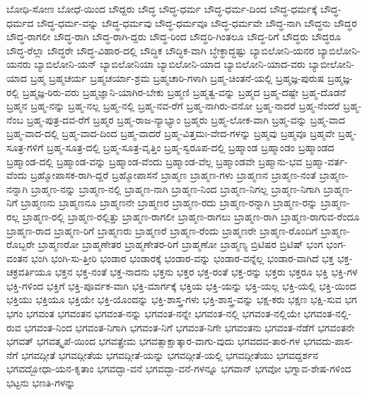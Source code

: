 {ಬೋಧಿ-ಸೋಣ
ಬೋಧೆ-ಯಿಂದ
ಬೌದ್ದರು
ಬೌದ್ಧ
ಬೌದ್ಧ-ಧರ್ಮ
ಬೌದ್ಧ-ಧರ್ಮ-ದಿಂದ
ಬೌದ್ಧ-ಧರ್ಮಕ್ಕೆ
ಬೌದ್ಧ-ಧರ್ಮದ
ಬೌದ್ಧ-ಧರ್ಮ-ವನ್ನು
ಬೌದ್ಧ-ಧರ್ಮವು
ಬೌದ್ಧ-ಧರ್ಮವೂ
ಬೌದ್ಧ-ಧರ್ಮವೇ
ಬೌದ್ಧ-ನಾಗಿ
ಬೌದ್ಧನು
ಬೌದ್ಧರ
ಬೌದ್ಧ-ರಾಗಲೀ
ಬೌದ್ಧ-ರಾಗಿ
ಬೌದ್ಧ-ರಾಗಿ-ದ್ದರು
ಬೌದ್ಧ-ರಿಂದ
ಬೌದ್ಧರಿ-ಗಿಂತಲೂ
ಬೌದ್ಧ-ರಿಗೆ
ಬೌದ್ಧರು
ಬೌದ್ಧರೂ
ಬೌದ್ಧ-ರೆಲ್ಲಾ
ಬೌದ್ಧರೇ
ಬೌದ್ಧ-ವಿಹಾರ-ದಲ್ಲಿ
ಬೌದ್ಧಿಕ
ಬೌದ್ಧಿಕ-ವಾಗಿ
ಬ್ಧೇಕ್ಧಾದ್ಧಷ್ಟು
ಬ್ಯಾಬಿಲೋನಿ-ಯನರ
ಬ್ಯಾಬಿಲೋನಿ-ಯನರು
ಬ್ಯಾಬಿಲೋನಿ-ಯನ್
ಬ್ಯಾಬಿಲೋನಿಯಾ
ಬ್ಯಾಬಿಲೋನಿ-ಯಾದ
ಬ್ಯಾಬಿಲೋನಿ-ಯಾದ-ವರು
ಬ್ಯಾಬೀಲೋನಿ-ಯಾದ
ಬ್ರಹ್ಮ
ಬ್ರಹ್ಮಚರ್ಯ
ಬ್ರಹ್ಮಚರ್ಯಾ-ಶ್ರಮ
ಬ್ರಹ್ಮಚಾರಿ-ಗಳಾಗಿ
ಬ್ರಹ್ಮ-ಚಿಂತನೆ-ಯಲ್ಲಿ
ಬ್ರಹ್ಮಜ್ಞ-ಪುರುಷ
ಬ್ರಹ್ಮಜ್ಞ-ರಲ್ಲಿ
ಬ್ರಹ್ಮಜ್ಞ-ರಿರು-ವರು
ಬ್ರಹ್ಮಜ್ಞಾನಿ-ಯಾಗಿರ-ಬೇಕು
ಬ್ರಹ್ಮಣಿ
ಬ್ರಹ್ಮತ್ವ-ವನ್ನು
ಬ್ರಹ್ಮದ
ಬ್ರಹ್ಮ-ದಷ್ಟೇ
ಬ್ರಹ್ಮ-ದೊಡನೆ
ಬ್ರಹ್ಮನ
ಬ್ರಹ್ಮ-ನನ್ನು
ಬ್ರಹ್ಮ-ನಲ್ಲ
ಬ್ರಹ್ಮ-ನಲ್ಲಿ
ಬ್ರಹ್ಮ-ನವ-ರೆಗೆ
ಬ್ರಹ್ಮ-ನಾಗಿರು-ವನೋ
ಬ್ರಹ್ಮ-ನಾದರೆ
ಬ್ರಹ್ಮ-ನೆಂದರೆ
ಬ್ರಹ್ಮ-ನೆಂಬ
ಬ್ರಹ್ಮ-ಪುತ್ರ-ದವ-ರೆಗೆ
ಬ್ರಹ್ಮರ
ಬ್ರಹ್ಮ-ರಾಜ-ನ್ಯಾಭ್ಯಾಂ
ಬ್ರಹ್ಮರು
ಬ್ರಹ್ಮ-ಲೋಕ-ವಾಗಿ
ಬ್ರಹ್ಮ-ವನ್ನು
ಬ್ರಹ್ಮ-ವಾದ
ಬ್ರಹ್ಮ-ವಾದ-ದಲ್ಲಿ
ಬ್ರಹ್ಮ-ವಾದ-ದಿಂದ
ಬ್ರಹ್ಮ-ವಾದರೆ
ಬ್ರಹ್ಮ-ವಿತ್ತಮಃ-ವೇದ-ಗಳನ್ನು
ಬ್ರಹ್ಮವು
ಬ್ರಹ್ಮವೂ
ಬ್ರಹ್ಮವೇ
ಬ್ರಹ್ಮ-ಸೂತ್ರ-ಗಳಿಗೆ
ಬ್ರಹ್ಮ-ಸೂತ್ರ-ದಲ್ಲಿ
ಬ್ರಹ್ಮ-ಸೂತ್ರ-ವೃತ್ತಿಂ
ಬ್ರಹ್ಮ-ಸ್ವರೂಪ-ದಲ್ಲಿ
ಬ್ರಹ್ಮಾಂಡ
ಬ್ರಹ್ಮಾಂಡಂ
ಬ್ರಹ್ಮಾಂಡದ
ಬ್ರಹ್ಮಾಂಡ-ದಲ್ಲಿ
ಬ್ರಹ್ಮಾಂಡ-ವನ್ನು
ಬ್ರಹ್ಮಾಂಡ-ವೆಂದು
ಬ್ರಹ್ಮಾಂಡ-ವೆಲ್ಲ
ಬ್ರಹ್ಮಾಂಡವೇ
ಬ್ರಹ್ಮಾನು-ಭವ
ಬ್ರಹ್ಮಾ-ವರ್ತ-ವೆಂದು
ಬ್ರಹ್ಮೋಪಾಸಕ-ರಾಗಿ-ದ್ದರೆ
ಬ್ರಹ್ಮೋಪಾಸನೆ
ಬ್ರಾಹ್ಮಣ
ಬ್ರಾಹ್ಮಣ-ಗಳು
ಬ್ರಾಹ್ಮಣನ
ಬ್ರಾಹ್ಮಣ-ನಂತೆ
ಬ್ರಾಹ್ಮಣ-ನನ್ನಾಗಿ
ಬ್ರಾಹ್ಮಣ-ನನ್ನು
ಬ್ರಾಹ್ಮಣ-ನಲ್ಲಿ
ಬ್ರಾಹ್ಮಣ-ನಾಗಿ
ಬ್ರಾಹ್ಮಣ-ನಿಂದ
ಬ್ರಾಹ್ಮಣ-ನಿಗಲ್ಲ
ಬ್ರಾಹ್ಮಣ-ನಿಗಾಗಿ
ಬ್ರಾಹ್ಮಣ-ನಿಗೆ
ಬ್ರಾಹ್ಮಣನು
ಬ್ರಾಹ್ಮಣನೂ
ಬ್ರಾಹ್ಮಣನೇ
ಬ್ರಾಹ್ಮಣರ
ಬ್ರಾಹ್ಮಣ-ರದು
ಬ್ರಾಹ್ಮಣ-ರನ್ನಾಗಿ
ಬ್ರಾಹ್ಮಣ-ರನ್ನು
ಬ್ರಾಹ್ಮಣ-ರಲ್ಲ
ಬ್ರಾಹ್ಮಣ-ರಲ್ಲಿ
ಬ್ರಾಹ್ಮಣ-ರಲ್ಲಿತ್ತು
ಬ್ರಾಹ್ಮಣ-ರಾಗಲೀ
ಬ್ರಾಹ್ಮಣ-ರಾಗಲು
ಬ್ರಾಹ್ಮಣ-ರಾಗಿ
ಬ್ರಾಹ್ಮಣ-ರಾಗುವ-ರೆಂದೂ
ಬ್ರಾಹ್ಮಣ-ರಾದ
ಬ್ರಾಹ್ಮಣ-ರಿಗೆ
ಬ್ರಾಹ್ಮಣರು
ಬ್ರಾಹ್ಮಣರೆ
ಬ್ರಾಹ್ಮಣ-ರೆಂದು
ಬ್ರಾಹ್ಮಣರೇ
ಬ್ರಾಹ್ಮಣ-ರೊಂದಿಗೆ
ಬ್ರಾಹ್ಮಣ-ರೊಬ್ಬರೇ
ಬ್ರಾಹ್ಮಣರೋ
ಬ್ರಾಹ್ಮಣೇತರ
ಬ್ರಾಹ್ಮಣೇತರ-ರಿಗೆ
ಬ್ರಾಹ್ಮಣೋ
ಬ್ರಾಹ್ಮಣ್ಯ
ಬ್ರಿಟಿಷರ
ಬ್ರಿಟಿಷ್
ಭಂಗ
ಭಂಗ-ವಂತನ
ಭಂಗಿ
ಭಂಗಿ-ಸು-ತ್ತೀರಿ
ಭಂಡಾರ
ಭಂಡಾರಕ್ಕೆ
ಭಂಡಾರ-ವನ್ನು
ಭಂಡಾರ-ವನ್ನೆಲ್ಲ
ಭಂಡಾರ-ವಾಗಿದೆ
ಭಕ್ತ
ಭಕ್ತ-ಚಕ್ರವರ್ತಿಯೂ
ಭಕ್ತನ
ಭಕ್ತ-ನಂತೆ
ಭಕ್ತ-ನಾದನು
ಭಕ್ತನು
ಭಕ್ತರ
ಭಕ್ತ-ರಂತೆ
ಭಕ್ತ-ರನ್ನು
ಭಕ್ತರು
ಭಕ್ತರೂ
ಭಕ್ತಿ
ಭಕ್ತಿ-ಗಳ
ಭಕ್ತಿ-ಗಳಿಂದ
ಭಕ್ತಿಗೆ
ಭಕ್ತಿ-ಪೂರ್ವಕ-ವಾಗಿ
ಭಕ್ತಿ-ಮಾರ್ಗಕ್ಕೆ
ಭಕ್ತಿಯ
ಭಕ್ತಿ-ಯನ್ನು
ಭಕ್ತಿ-ಯಲ್ಲ
ಭಕ್ತಿ-ಯಲ್ಲಿ
ಭಕ್ತಿ-ಯಿಂದ
ಭಕ್ತಿಯು
ಭಕ್ತಿಯೂ
ಭಕ್ತಿಯೇ
ಭಕ್ತಿ-ಯೊಂದನ್ನು
ಭಕ್ತಿ-ಶಾಸ್ತ್ರ-ಗಳು
ಭಕ್ತಿ-ಶಾಸ್ತ್ರ-ವನ್ನು
ಭಕ್ಷ-ಕರು
ಭಕ್ಷಣ
ಭಕ್ಷಿ-ಸುವ
ಭಗ
ಭಗಂ
ಭಗವಂತ
ಭಗವಂತನ
ಭಗವಂತ-ನನ್ನು
ಭಗವಂತ-ನನ್ನೇ
ಭಗವಂತ-ನಲ್ಲಿ
ಭಗವಂತ-ನಲ್ಲಿಯೇ
ಭಗವಂತ-ನಲ್ಲಿ-ರುವ
ಭಗವಂತ-ನಿಂದ
ಭಗವಂತ-ನಿಗಾಗಿ
ಭಗವಂತ-ನಿಗೆ
ಭಗವಂತ-ನಿಗೇ
ಭಗವಂತನು
ಭಗವಂತ-ನೆಡೆಗೆ
ಭಗವಂತನೇ
ಭಗವತ್
ಭಗವತ್ಕೃಪೆ-ಯಿಂದ
ಭಗವತ್ಪ್ರೇಮ
ಭಗವತ್ಸಾಕ್ಷಾತ್ಕಾರ-ವಾಗು-ವುದು
ಭಗವದವ-ತಾರ-ಗಳ
ಭಗವದು-ಪಾಸ-ನೆಗೆ
ಭಗವದ್ಗೀತೆ
ಭಗವದ್ಗೀತೆಯ
ಭಗವದ್ಗೀತೆ-ಯನ್ನು
ಭಗವದ್ಗೀತೆ-ಯಲ್ಲಿ
ಭಗವದ್ಗೀತೆಯು
ಭಗವದ್ದರ್ಶನ
ಭಗವದ್ಬೋಧಾ-ಯನ-ಕೃತಾಂ
ಭಗವದ್ಭಾ-ವನೆ
ಭಗವದ್ಭಾ-ವನೆ-ಗಳನ್ನೂ
ಭಗವಾನ್
ಭಗವೋ
ಭಗ್ನಾವ-ಶೇಷ-ಗಳಿಂದ
ಭಟ್ಟನು
ಭಣತಿ-ಗಳನ್ನು
}
